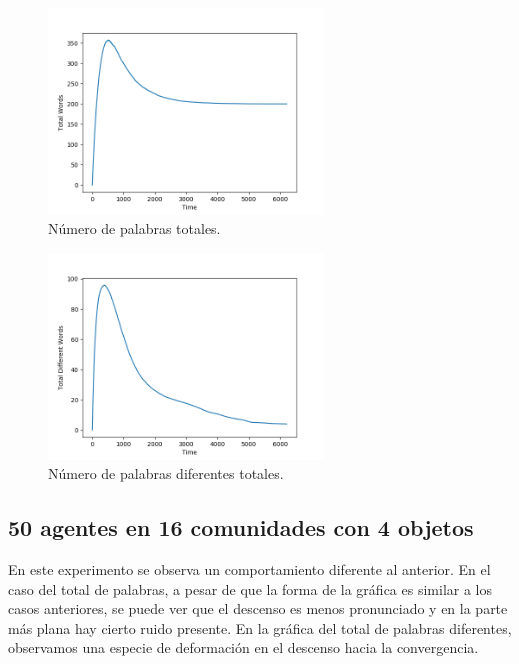 \documentclass[runningheads]{llncs}
\begin{document}
\begin{figure}[H]
	\centering
	\includegraphics[width=0.65\textwidth]{Figure_111_TotalWords.png}
	\caption{Número de palabras totales.}
	\label{fig_000}
\end{figure}
\begin{figure}[H]
	\centering
	\includegraphics[width=0.65\textwidth]{Figure_111_TotalDifferentWords.png}
	\caption{Número de palabras diferentes totales.}
	\label{fig_001}
\end{figure}
\pagebreak
\subsection{50 agentes en 16 comunidades con 4 objetos}

En este experimento se observa un comportamiento diferente al anterior. En el caso del total de palabras, a pesar de que la forma de la gráfica es similar a los casos anteriores, se puede ver que el descenso es menos pronunciado y en la parte más plana hay cierto ruido presente. En la gráfica del total de palabras diferentes, observamos una especie de deformación en el descenso hacia la convergencia. 
\end{document}

